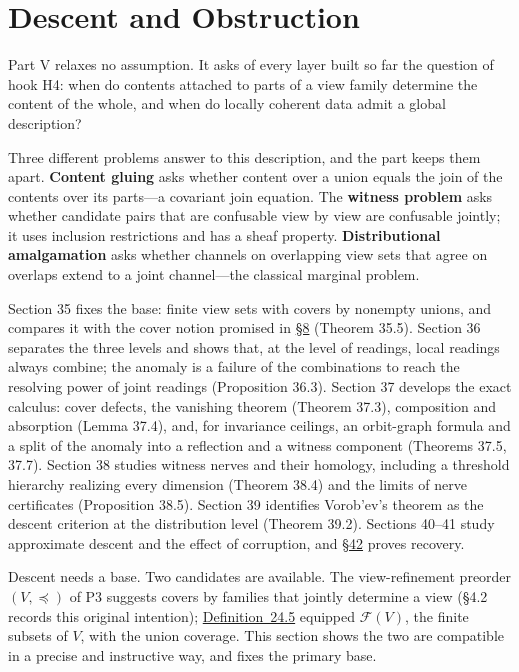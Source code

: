 \part{Descent and Obstruction}


Part V relaxes no assumption. It asks of every layer built so far the question of hook H4: when do contents attached to parts of a view family determine the content of the whole, and when do locally coherent data admit a global description?

Three different problems answer to this description, and the part keeps them apart. \textbf{Content gluing} asks whether content over a union equals the join of the contents over its parts---\hspace{0pt}a covariant join equation. The \textbf{witness problem} asks whether candidate pairs that are confusable view by view are confusable jointly; it uses inclusion restrictions and has a sheaf property. \textbf{Distributional amalgamation} asks whether channels on overlapping view sets that agree on overlaps extend to a joint channel---\hspace{0pt}the classical marginal problem.

Section 35 fixes the base: finite view sets with covers by nonempty unions, and compares it with the cover notion promised in \hyperlink{sec:8}{§8} (Theorem 35.5). Section 36 separates the three levels and shows that, at the level of readings, local readings always combine; the anomaly is a failure of the combinations to reach the resolving power of joint readings (Proposition 36.3). Section 37 develops the exact calculus: cover defects, the vanishing theorem (Theorem 37.3), composition and absorption (Lemma 37.4), and, for invariance ceilings, an orbit-graph formula and a split of the anomaly into a reflection and a witness component (Theorems 37.5, 37.7). Section 38 studies witness nerves and their homology, including a threshold hierarchy realizing every dimension (Theorem 38.4) and the limits of nerve certificates (Proposition 38.5). Section 39 identifies Vorob'ev's theorem as the descent criterion at the distribution level (Theorem 39.2). Sections 40--41 study approximate descent and the effect of corruption, and \hyperlink{sec:42}{§42} proves recovery.


Descent needs a base. Two candidates are available. The view-refinement preorder \((V, \preceq)\) of P3 suggests covers by families that jointly determine a view (§4.2 records this original intention); \hyperlink{stmt:24.5}{Definition~24.5} equipped \(\mathcal{F}(V)\), the finite subsets of \(V\), with the union coverage. This section shows the two are compatible in a precise and instructive way, and fixes the primary base.

